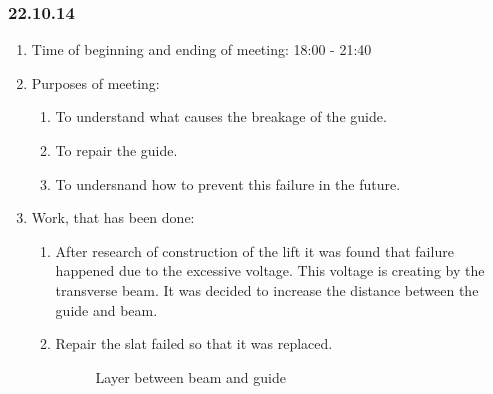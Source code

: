 
\subsubsection{22.10.14}

\begin{enumerate}
	\item Time of beginning and ending of meeting:
	18:00 - 21:40
	\item Purposes of meeting:
	\begin{enumerate}
	  \item To understand what causes the breakage of the guide.
	  
	  \item To repair the guide.
	  
	  \item To undersnand how to prevent this failure in the future.
	  
    \end{enumerate}
    
	\item Work, that has been done:
	\begin{enumerate}
	  \item After research of construction of the lift it was found that failure happened due to the excessive voltage. This voltage is creating by the transverse beam. It was decided to increase the distance between the guide and beam.
      
      \item Repair the slat failed so that it was replaced.
      
      \begin{figure}[H]
      	\begin{minipage}[h]{1\linewidth}
      		\caption{Layer between beam and guide}
      	\end{minipage}
      \end{figure}
      

\end{enumerate}
\end{enumerate}
